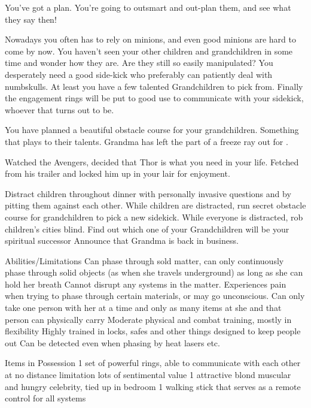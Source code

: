 \documentclass[char]{LRSguildcamp1}
\begin{document}
You've got a plan. You're  going to outsmart and out-plan them, and see what they say then! 

Nowadays you often has to rely on minions, and even good minions are hard to come by now. You haven't seen your other children and grandchildren in some time and wonder how they are. Are they still so easily manipulated? You desperately need a good side-kick who preferably can patiently deal with numbskulls.  At least you have a few talented Grandchildren to pick from. Finally the engagement rings will be put to good use to communicate with your sidekick, whoever that turns out to be. 

You have planned a beautiful obstacle course for your grandchildren. Something that plays to their talents. Grandma has left the part of a freeze ray out for \cTeen{}. 

Watched the Avengers, decided that Thor is what you need in your life. Fetched \cChrisHemsworth{\intro} from his trailer and locked him up in your lair for enjoyment.

\begin{itemz}[Goals]
	\item 
	Distract children throughout dinner with personally invasive questions and by pitting them against each other. 
	While children are distracted, run secret obstacle course for grandchildren to pick a new sidekick. 
	While everyone is distracted, rob children’s cities blind. 
	Find out which one of your Grandchildren will be your spiritual successor 
	Announce that Grandma is back in business. 
	
\end{itemz}

\begin{itemz}[Notes]
	\item 
	
	Abilities/Limitations 
	Can phase through sold matter, can only continuously phase through solid objects (as when she travels underground) as long as she can hold her breath 
	Cannot disrupt any systems in the matter. 
	Experiences pain when trying to phase through certain materials, or may go unconscious. 
	Can only take one person with her at a time and only as many items at she and that person can physically carry 
	Moderate physical and combat training, mostly in flexibility 
	Highly trained in locks, safes and other things designed to keep people out 
	Can be detected even when phasing by heat lasers etc. 
	
	Items in Possession
	1 set of powerful rings, able to communicate with each other at no distance limitation lots of sentimental value 
	1 attractive blond muscular and hungry celebrity, tied up in bedroom 
	1 walking stick that serves as a remote control for all systems 
	
\end{itemz}
\end{document}
